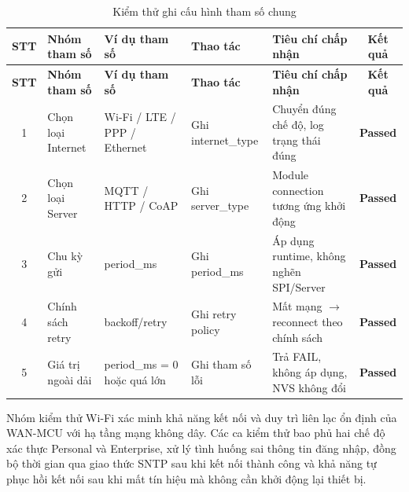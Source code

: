         \begin{longtable}{|c|p{2cm}|p{3.5cm}|p{2.5cm}|p{4cm}|c|}
            \caption{Kiểm thử ghi cấu hình tham số chung}
            \label{tab:test_write_config} \\
            \hline
            \textbf{STT} & \textbf{Nhóm tham số} & \textbf{Ví dụ tham số} & \textbf{Thao tác} & \textbf{Tiêu chí chấp nhận} & \textbf{Kết quả} \\ \hline
            \endfirsthead

            \hline
            \textbf{STT} & \textbf{Nhóm tham số} & \textbf{Ví dụ tham số} & \textbf{Thao tác} & \textbf{Tiêu chí chấp nhận} & \textbf{Kết quả} \\ \hline
            \endhead

            \hline
            \endfoot
            \endlastfoot

            1 & Chọn loại Internet & Wi-Fi / LTE / PPP / Ethernet & Ghi internet\_type & Chuyển đúng chế độ, log trạng thái đúng & \textcolor{modern_blue}{\textbf{Passed}} \\ \hline
            2 & Chọn loại Server & MQTT / HTTP / CoAP & Ghi server\_type & Module connection tương ứng khởi động & \textcolor{modern_blue}{\textbf{Passed}} \\ \hline
            3 & Chu kỳ gửi & period\_ms & Ghi period\_ms & Áp dụng runtime, không nghẽn SPI/Server & \textcolor{modern_blue}{\textbf{Passed}} \\ \hline
            4 & Chính sách retry & backoff/retry & Ghi retry policy & Mất mạng $\rightarrow$ reconnect theo chính sách & \textcolor{modern_blue}{\textbf{Passed}} \\ \hline
            5 & Giá trị ngoài dải & period\_ms = 0 hoặc quá lớn & Ghi tham số lỗi & Trả FAIL, không áp dụng, NVS không đổi & \textcolor{modern_blue}{\textbf{Passed}} \\ \hline
        \end{longtable}

        Nhóm kiểm thử Wi-Fi xác minh khả năng kết nối và duy trì liên lạc ổn định của WAN-MCU với hạ tầng mạng không dây. Các ca kiểm thử bao phủ hai chế độ xác thực Personal và Enterprise, xử lý tình huống sai thông tin đăng nhập, đồng bộ thời gian qua giao thức SNTP sau khi kết nối thành công và khả năng tự phục hồi kết nối sau khi mất tín hiệu mà không cần khởi động lại thiết bị.

